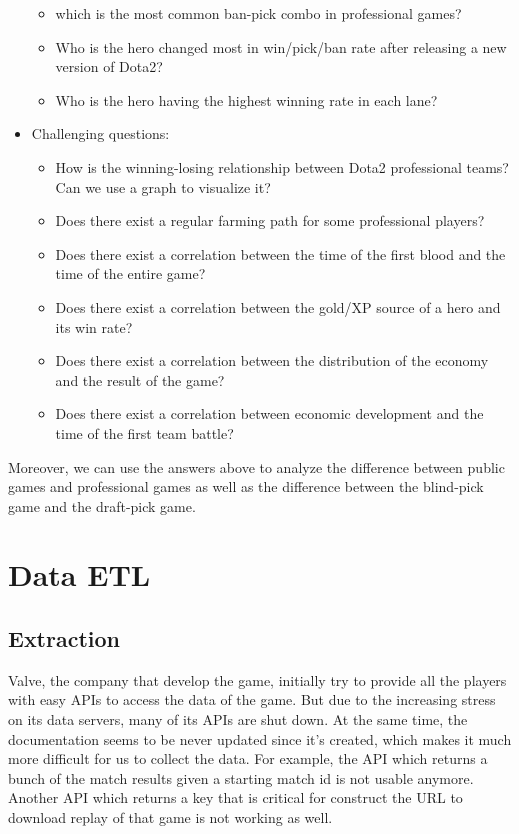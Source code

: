 \documentclass{article}
\begin{document}
\begin{itemize}
\begin{itemize}
        \item which is the most common ban-pick combo in professional games?
        \item Who is the hero changed most in win/pick/ban rate after releasing a new version of Dota2?
        \item Who is the hero having the highest winning rate in each lane?
    \end{itemize}
    \item Challenging questions:
    \begin{itemize}
        \item How is the winning-losing relationship between Dota2 professional teams? Can we use a graph to visualize it?
        \item Does there exist a regular farming path for some professional players?
        \item Does there exist a correlation between the time of the first blood and the time of the entire game?
        \item Does there exist a correlation between the gold/XP source of a hero and its win rate?
        \item Does there exist a correlation between the distribution of the economy and the result of the game?
        \item Does there exist a correlation between economic development and the time of the first team battle?
    \end{itemize}
\end{itemize}

Moreover, we can use the answers above to analyze the difference between public games and professional games as well as the difference between the blind-pick game and the draft-pick game.


\section{Data ETL}

\subsection{Extraction}

Valve, the company that develop the game, initially try to provide all the players with easy APIs to access the data of the game.
But due to the increasing stress on its data servers, many of its APIs are shut down.
At the same time, the documentation seems to be never updated since it's created, which makes it much more difficult for us to collect the data.
For example, the API which returns a bunch of the match results given a starting match id is not usable anymore.
Another API which returns a key that is critical for construct the URL to download replay of that game is not working as well.
\end{document}
